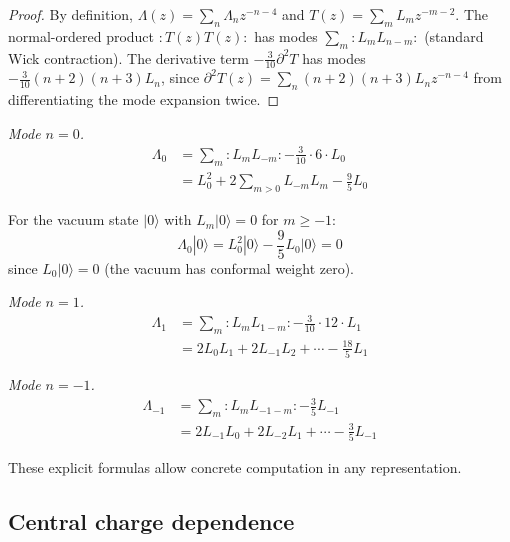 \begin{proof}
By definition, $\Lambda(z) = \sum_n \Lambda_n z^{-n-4}$ and $T(z) = \sum_m L_m z^{-m-2}$.  The normal-ordered product $:T(z)T(z):$ has modes $\sum_m :L_m L_{n-m}:$ (standard Wick contraction).  The derivative term $-\frac{3}{10}\partial^2 T$ has modes $-\frac{3}{10}(n+2)(n+3)L_n$, since $\partial^2 T(z) = \sum_n (n+2)(n+3)L_n z^{-n-4}$ from differentiating the mode expansion twice.
\end{proof}

\begin{computation}\label{comp:lambda-low-modes}

\emph{Mode $n=0$.}
\begin{align}
\Lambda_0 &= \sum_{m} :L_m L_{-m}: - \frac{3}{10} \cdot 6 \cdot L_0 \\
&= L_0^2 + 2\sum_{m>0} L_{-m}L_m - \frac{9}{5} L_0
\end{align}

For the vacuum state $|0\rangle$ with $L_m|0\rangle = 0$ for $m \geq -1$:
\[\Lambda_0|0\rangle = L_0^2|0\rangle - \frac{9}{5} L_0|0\rangle = 0\]
since $L_0|0\rangle = 0$ (the vacuum has conformal weight zero).

\emph{Mode $n=1$.}
\begin{align}
\Lambda_1 &= \sum_m :L_m L_{1-m}: - \frac{3}{10} \cdot 12 \cdot L_1 \\
&= 2L_0 L_1 + 2L_{-1}L_2 + \cdots - \frac{18}{5} L_1
\end{align}

\emph{Mode $n=-1$.}
\begin{align}
\Lambda_{-1} &= \sum_m :L_m L_{-1-m}: - \frac{3}{5} L_{-1} \\
&= 2L_{-1} L_0 + 2L_{-2} L_1 + \cdots - \frac{3}{5} L_{-1}
\end{align}

These explicit formulas allow concrete computation in any representation.
\end{computation}

\subsection{Central charge dependence}
\label{subsec:c-dependence-analysis}

